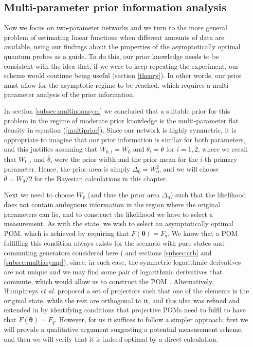 \subsection{Multi-parameter prior information analysis}
\label{subsec:multiprioranalysis}

Now we focus on two-parameter networks and we turn to the more general problem of estimating linear functions when different amounts of data are available, using our findings about the properties of the asymptotically optimal quantum probes as a guide. To do this, our prior knowledge needs to be consistent with the idea that, if we were to keep repeating the experiment, our scheme would continue being useful (section \ref{theory}). In other words, our prior must allow for the asymptotic regime to be reached, which requires a multi-parameter analysis of the prior information.

In section \ref{subsec:multinonasym} we concluded that a suitable prior for this problem in the regime of moderate prior knowledge is the multi-parameter flat density in equation (\ref{multiprior}). Since our network is highly symmetric, it is appropriate to imagine that our prior information is similar for both parameters, and this justifies assuming that $W_{0,i} = W_0$ and $\bar{\theta}_i = \bar{\theta}$ for $i = 1 , 2$, where we recall that $W_{0, i}$ and $\bar{\theta}_i$ were the prior width and the prior mean for the $i$-th primary parameter. Hence, the prior area is simply $\Delta_0 = W_0^2$, and we will choose $\bar{\theta} = W_0/2$ for the Bayesian calculations in this chapter. 

Next we need to choose $W_0$ (and thus the prior area $\Delta_0$) such that the likelihood does not contain ambiguous information in the region where the original parameters can lie, and to construct the likelihood we have to select a measurement. As with the state, we wish to select an asymptotically optimal POM, which is achieved by requiring that $F(\boldsymbol{\theta})=F_q$. We know that a POM fulfilling this condition always exists for the scenario with pure states and commuting generators considered here (\cite{sammy2016compatibility, pezze2017simultaneous} and sections \ref{subsec:crb} and \ref{subsec:multiasymp}), since, in such case, the symmetric logarithmic derivatives are not unique and we may find some pair of logarithmic derivatives that commute, which would allow us to construct the POM \cite{sammy2016compatibility}. Alternatively, Humphreys \emph{et al.} \cite{humphreys2013} proposed a set of projectors such that one of the elements is the original state, while the rest are orthogonal to it, and this idea was refined and extended in \cite{pezze2017simultaneous} by identifying conditions that projective POMs need to fulfil to have that $F(\boldsymbol{\theta})=F_q$. However, for us it suffices to follow a simpler approach; first we will provide a qualitative argument suggesting a potential measurement scheme, and then we will verify that it is indeed optimal by a direct calculation.  


